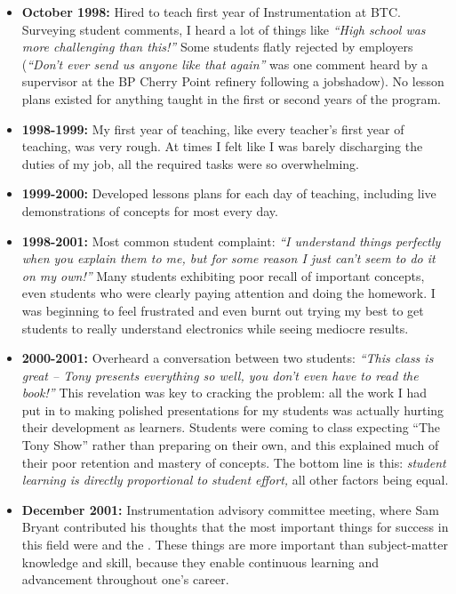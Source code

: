 \begin{itemize}
\item{} {\bf October 1998:} Hired to teach first year of Instrumentation at BTC.  Surveying student comments, I heard a lot of things like {\it ``High school was more challenging than this!''}  Some students flatly rejected by employers ({\it ``Don't ever send us anyone like that again''} was one comment heard by a supervisor at the BP Cherry Point refinery following a jobshadow).  No lesson plans existed for anything taught in the first or second years of the program.
\vskip 10pt
\item{} {\bf 1998-1999:} My first year of teaching, like every teacher's first year of teaching, was very rough.  At times I felt like I was barely discharging the duties of my job, all the required tasks were so overwhelming.
\vskip 10pt
\item{} {\bf 1999-2000:} Developed lessons plans for each day of teaching, including live demonstrations of concepts for most every day.
\vskip 10pt
\item{} {\bf 1998-2001:} Most common student complaint: {\it ``I understand things perfectly when you explain them to me, but for some reason I just can't seem to do it on my own!''}  Many students exhibiting poor recall of important concepts, even students who were clearly paying attention and doing the homework.  I was beginning to feel frustrated and even burnt out trying my best to get students to really understand electronics while seeing mediocre results.
\vskip 10pt
\item{} {\bf 2000-2001:} Overheard a conversation between two students: {\it ``This class is great -- Tony presents everything so well, you don't even have to read the book!''}  This revelation was key to cracking the problem: all the work I had put in to making polished presentations for my students was actually hurting their development as learners.  Students were coming to class expecting ``The Tony Show'' rather than preparing on their own, and this explained much of their poor retention and mastery of concepts.  The bottom line is this: {\it student learning is directly proportional to student effort,} all other factors being equal.
\vskip 10pt
\item{} {\bf December 2001:} Instrumentation advisory committee meeting, where Sam Bryant contributed his thoughts that the most important things for success in this field were  and the .  These things are more important than subject-matter knowledge and skill, because they enable continuous learning and advancement throughout one's career.

\end{itemize}
